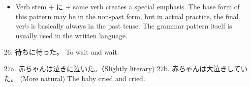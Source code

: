 \begin{itemize}
 
\item Verb stem + に + same verb      creates a special emphasis. The base form of this pattern may be in the non-past form, but in actual practice, the final verb is basically always in the past tense. The grammar pattern itself is usually used in the written language. 
\end{itemize}
 
\par{26. 待ちに待った。 \hfill\break
To wait and wait. }
 
\par{27a. 赤ちゃんは泣きに泣いた。（Slightly literary) \hfill\break
27b. 赤ちゃんは大泣きしていた。 (More natural) \hfill\break
The baby cried and cried. }
    
